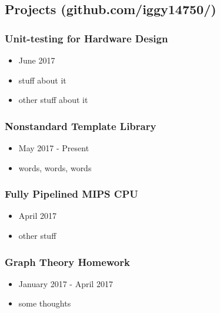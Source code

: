 \documentclass[18pt]{article}
\providecommand{\tightlist}{
    \setlength{\itemsep}{0pt}\setlength{\parskip}{0pt}
}
\begin{document}
  \begin{multicols}{2}

  \subsection*{Projects (github.com/iggy14750/)}\label{projects}
        
      \subsubsection*{Unit-testing for Hardware Design}
      \begin{itemize}\tightlist
        \item June 2017
        \item stuff about it
        \item other stuff about it
      \end{itemize}
        
      \subsubsection*{Nonstandard Template Library}
      \begin{itemize}\tightlist
        \item May 2017 - Present
        \item words, words, words
      \end{itemize}
          
      \subsubsection*{Fully Pipelined MIPS CPU}
      \begin{itemize}\tightlist
        \item April 2017
        \item other stuff
      \end{itemize}
      
      \subsubsection*{Graph Theory Homework}
      \begin{itemize}\tightlist
        \item January 2017 - April 2017
        \item some thoughts
      \end{itemize}
      

\end{multicols}
\end{document}

